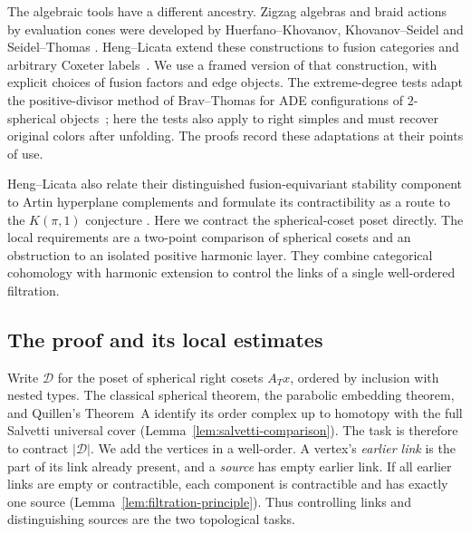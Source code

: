 The algebraic tools have a different ancestry.  Zigzag algebras and
braid actions by evaluation cones were developed by
Huerfano--Khovanov, Khovanov--Seidel and Seidel--Thomas
\cite{HuerfanoKhovanov2001,KhovanovSeidel2002,SeidelThomas2001}.
Heng--Licata extend these constructions to fusion categories and
arbitrary Coxeter labels~\cite[Sections~4--5]{HengLicata2024}.
We use a framed version of that construction, with explicit choices of
fusion factors and edge objects.  The extreme-degree tests adapt the
positive-divisor method of Brav--Thomas for ADE configurations of
$2$-spherical objects~\cite[Section~3]{BravThomas2011}; here the tests
also apply to right simples and must recover original colors after
unfolding.  The proofs record these adaptations at their points of use.

Heng--Licata also relate their distinguished fusion-equivariant
stability component to Artin hyperplane complements and formulate its
contractibility as a route to the \(K(\pi,1)\) conjecture
\cite[Theorem~7.7 and Conjecture~7.12]{HengLicata2024}.  Here we contract
the spherical-coset poset directly.  The local requirements are a
two-point comparison of spherical cosets and an obstruction to an isolated
positive harmonic layer.  They combine categorical cohomology with
harmonic extension to control the links of a single well-ordered filtration.

\subsection{The proof and its local estimates}

Write \(\mathcal D\) for the poset of spherical right cosets
\(A_Tx\), ordered by inclusion with nested types.
The classical spherical theorem, the parabolic embedding theorem,
and Quillen's Theorem~A identify its order complex up to homotopy
with the full Salvetti universal cover
(Lemma~\ref{lem:salvetti-comparison}).
The task is therefore to contract \(|\mathcal D|\).
We add the vertices in a well-order.  A vertex's \emph{earlier link}
is the part of its link already present, and a \emph{source} has
empty earlier link.  If all earlier links are empty or contractible,
each component is contractible and has exactly one source
(Lemma~\ref{lem:filtration-principle}).  Thus controlling links and
distinguishing sources are the two topological tasks.

